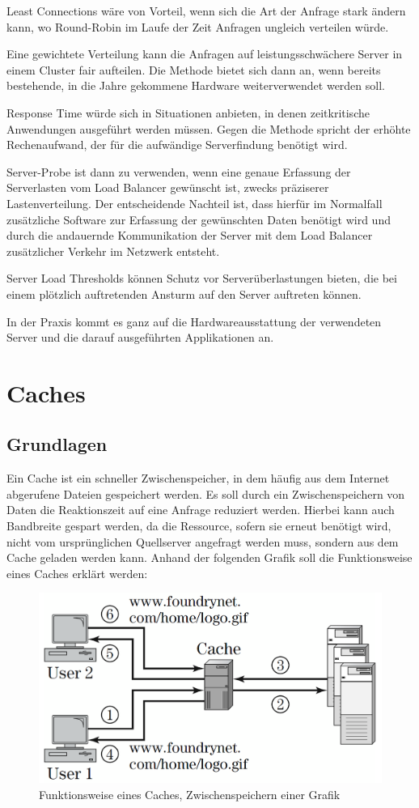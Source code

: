 Least Connections wäre von Vorteil, wenn sich die Art der Anfrage stark ändern kann, wo Round-Robin im Laufe der Zeit Anfragen ungleich verteilen würde.

Eine gewichtete Verteilung kann die Anfragen auf leistungsschwächere Server in einem Cluster fair aufteilen. Die Methode bietet sich dann an, wenn bereits bestehende, in die Jahre gekommene Hardware weiterverwendet werden soll.

Response Time würde sich in Situationen anbieten, in denen zeitkritische Anwendungen ausgeführt werden müssen. Gegen die Methode spricht der erhöhte Rechenaufwand, der für die aufwändige Serverfindung benötigt wird.

Server-Probe ist dann zu verwenden, wenn eine genaue Erfassung der Serverlasten vom Load Balancer gewünscht ist, zwecks präziserer Lastenverteilung. Der entscheidende Nachteil ist, dass hierfür im Normalfall zusätzliche Software zur Erfassung der gewünschten Daten benötigt wird und durch die andauernde Kommunikation der Server mit dem Load Balancer zusätzlicher Verkehr im Netzwerk entsteht.

Server Load Thresholds können Schutz vor Serverüberlastungen bieten, die bei einem plötzlich auftretenden Ansturm auf den Server auftreten können.

In der Praxis kommt es ganz auf die Hardwareausstattung der verwendeten Server und die darauf ausgeführten Applikationen an.


\section{Caches}
\label{sec:Caches}

\subsection{Grundlagen}
\label{sec:Grundlagen}
Ein Cache ist ein schneller Zwischenspeicher, in dem häufig aus dem Internet abgerufene Dateien gespeichert werden. Es soll durch ein Zwischenspeichern von Daten die Reaktionszeit auf eine Anfrage reduziert werden. Hierbei kann auch Bandbreite gespart werden, da die Ressource, sofern sie erneut benötigt wird, nicht vom ursprünglichen Quellserver angefragt werden muss, sondern aus dem Cache geladen werden kann.
Anhand der folgenden Grafik soll die Funktionsweise eines Caches erklärt werden:

\begin{figure}[!h]
	\begin{center}
		\includegraphics[width=0.5\linewidth]{images/Cache_Funktionsweise.png}
		\caption{Funktionsweise eines Caches, Zwischenspeichern einer Grafik \cite{LoadBalancing2}}
		\label{Cache_Funktionsweise}
	\end{center}
\end{figure}

